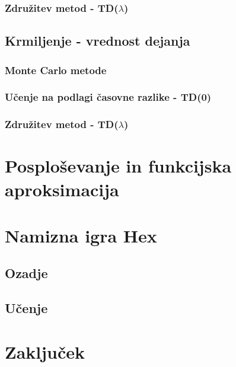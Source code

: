 \documentclass[a4paper, oneside, 12pt]{article}
\begin{document}
\subsubsection{Združitev metod - TD($\lambda$)}
\subsection{Krmiljenje - vrednost dejanja}
\subsubsection{Monte Carlo metode}
\subsubsection{Učenje na podlagi časovne razlike - TD(0)}
\subsubsection{Združitev metod - TD($\lambda$)}
\newpage

\section{Posploševanje in funkcijska aproksimacija}


\newpage

\section{Namizna igra Hex}
\subsection{Ozadje}
\subsection{Učenje}
\newpage

\section{Zaključek}
\newpage
\end{document}
